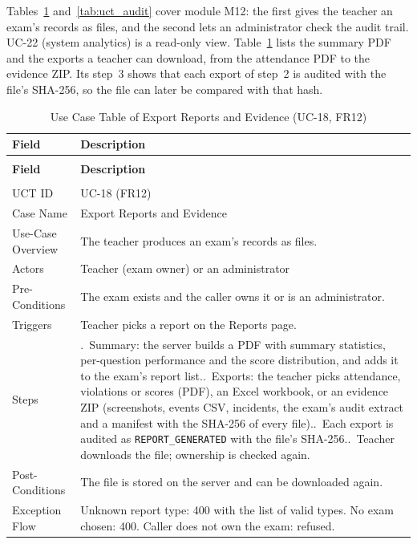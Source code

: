 Tables~\ref{tab:uct_audit_report} and~\ref{tab:uct_audit} cover module M12: the first gives the teacher an exam's records as files, and the second lets an administrator check the audit trail. UC-22 (system analytics) is a read-only view. Table~\ref{tab:uct_audit_report} lists the summary PDF and the exports a teacher can download, from the attendance PDF to the evidence ZIP. Its step~3 shows that each export of step~2 is audited with the file's SHA-256, so the file can later be compared with that hash.

{\renewcommand{\arraystretch}{1.1}\setlength{\tabcolsep}{6pt}
\begin{longtable}{>{\small\raggedright\arraybackslash}p{3.3cm}>{\small\raggedright\arraybackslash}p{\dimexpr\textwidth-3.3cm-4\tabcolsep\relax}}
\caption{Use Case Table of Export Reports and Evidence (UC-18, FR12)}\label{tab:uct_audit_report}\\ \hline\hline
\textbf{Field} & \textbf{Description} \\ \hline\hline
\endfirsthead
\multicolumn{2}{c}{\small\tablename~\thetable{} -- continued from previous page}\\ \hline\hline
\textbf{Field} & \textbf{Description} \\ \hline\hline
\endhead
\hline \multicolumn{2}{r}{\small Continued on next page}\\
\endfoot
\hline\hline
\endlastfoot
UCT ID & UC-18 (FR12) \\*
Case Name & Export Reports and Evidence \\*
Use-Case Overview & The teacher produces an exam's records as files. \\*
Actors & Teacher (exam owner) or an administrator \\*
Pre-Conditions & The exam exists and the caller owns it or is an administrator. \\*
Triggers & Teacher picks a report on the Reports page. \\
Steps & 1.~Summary: the server builds a PDF with summary statistics, per-question performance and the score distribution, and adds it to the exam's report list.\newline
2.~Exports: the teacher picks attendance, violations or scores (PDF), an Excel workbook, or an evidence ZIP (screenshots, events CSV, incidents, the exam's audit extract and a manifest with the SHA-256 of every file).\newline
3.~Each export is audited as \texttt{REPORT\_GENERATED} with the file's SHA-256.\newline
4.~Teacher downloads the file; ownership is checked again. \\
Post-Conditions & The file is stored on the server and can be downloaded again. \\
Exception Flow & Unknown report type: 400 with the list of valid types. No exam chosen: 400. Caller does not own the exam: refused. \\
\end{longtable}}

